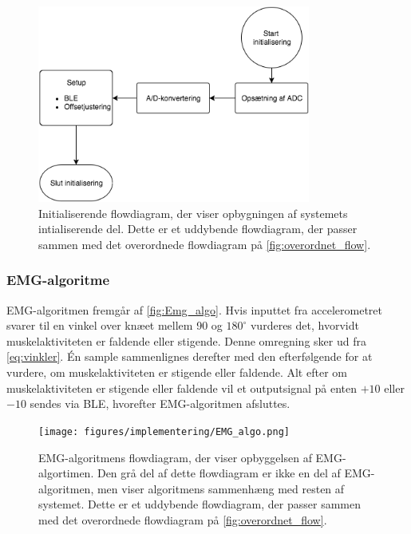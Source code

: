 \begin{figure}[H]
\centering
\includegraphics[width=0.8\textwidth]{figures/implementering/initialiserende_flow.png}
\caption{Initialiserende flowdiagram, der viser opbygningen af systemets intialiserende del. Dette er et uddybende flowdiagram, der passer sammen med det overordnede flowdiagram på \autoref{fig:overordnet_flow}.}
\label{fig:initialiserende_flow}
\end{figure}

\subsubsection{EMG-algoritme}
EMG-algoritmen fremgår af \autoref{fig:Emg_algo}. 
Hvis inputtet fra accelerometret svarer til en vinkel over knæet mellem 90 og $180^{\circ}$ vurderes det, hvorvidt muskelaktiviteten er faldende eller stigende. 
Denne omregning sker ud fra \autoref{eq:vinkler}. 
Én sample sammenlignes derefter med den efterfølgende for at vurdere, om muskelaktiviteten er stigende eller faldende. Alt efter om muskelaktiviteten er stigende eller faldende vil et outputsignal på enten $+10$ eller $-10$ sendes via BLE, hvorefter EMG-algoritmen afsluttes. 

\begin{figure}[H]
\centering
\texttt{[image: figures/implementering/EMG\_algo.png]}
\caption{EMG-algoritmens flowdiagram, der viser opbyggelsen af EMG-algortimen. Den grå del af dette flowdiagram er ikke en del af EMG-algoritmen, men viser algoritmens sammenhæng med resten af systemet. Dette er et uddybende flowdiagram, der passer sammen med det overordnede flowdiagram på \autoref{fig:overordnet_flow}.}
\label{fig:Emg_algo}
\end{figure}

